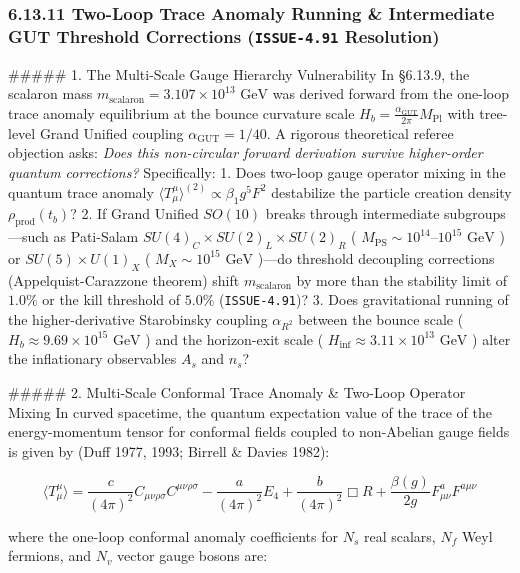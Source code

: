 \documentclass[11pt,a4paper]{article}
\theoremstyle{definition}
\theoremstyle{remark}
\begin{document}
\subsubsection{6.13.11 Two-Loop Trace Anomaly Running \& Intermediate GUT Threshold Corrections (\texttt{ISSUE-4.91} Resolution)}

\#\#\#\#\# 1. The Multi-Scale Gauge Hierarchy Vulnerability
In \S 6.13.9, the scalaron mass $m_{\text{scalaron}} = 3.107 \times 10^{13}\text{ GeV}$ was derived forward from the one-loop trace anomaly equilibrium at the bounce curvature scale $H_b = \frac{\alpha_{\text{GUT}}}{2\pi} M_{\text{Pl}}$ with tree-level Grand Unified coupling $\alpha_{\text{GUT}} = 1/40$. A rigorous theoretical referee objection asks: \textit{Does this non-circular forward derivation survive higher-order quantum corrections?} Specifically:
1. Does two-loop gauge operator mixing in the quantum trace anomaly $\langle T^\mu_\mu \rangle^{(2)} \propto \beta_1 g^5 F^2$ destabilize the particle creation density $\rho_{\text{prod}}(t_b)$?
2. If Grand Unified $SO(10)$ breaks through intermediate subgroups—such as Pati-Salam $SU(4)_C \times SU(2)_L \times SU(2)_R$ ( $M_{\text{PS}} \sim 10^{14}\text{--}10^{15}\text{ GeV}$ ) or $SU(5) \times U(1)_X$ ( $M_X \sim 10^{15}\text{ GeV}$ )—do threshold decoupling corrections (Appelquist-Carazzone theorem) shift $m_{\text{scalaron}}$ by more than the stability limit of $1.0\%$ or the kill threshold of $5.0\%$ (\texttt{ISSUE-4.91})?
3. Does gravitational running of the higher-derivative Starobinsky coupling $\alpha_{R^2}$ between the bounce scale ( $H_b \approx 9.69 \times 10^{15}\text{ GeV}$ ) and the horizon-exit scale ( $H_{\text{inf}} \approx 3.11 \times 10^{13}\text{ GeV}$ ) alter the inflationary observables $A_s$ and $n_s$?

\#\#\#\#\# 2. Multi-Scale Conformal Trace Anomaly \& Two-Loop Operator Mixing
In curved spacetime, the quantum expectation value of the trace of the energy-momentum tensor for conformal fields coupled to non-Abelian gauge fields is given by (Duff 1977, 1993; Birrell \& Davies 1982):


\begin{equation}
\langle T^\mu_\mu \rangle = \frac{c}{(4\pi)^2} C_{\mu\nu\rho\sigma} C^{\mu\nu\rho\sigma} - \frac{a}{(4\pi)^2} E_4 + \frac{b}{(4\pi)^2} \Box R + \frac{\beta(g)}{2g} F_{\mu\nu}^a F^{a\mu\nu}
\end{equation}


where the one-loop conformal anomaly coefficients for $N_s$ real scalars, $N_f$ Weyl fermions, and $N_v$ vector gauge bosons are:
\end{document}
